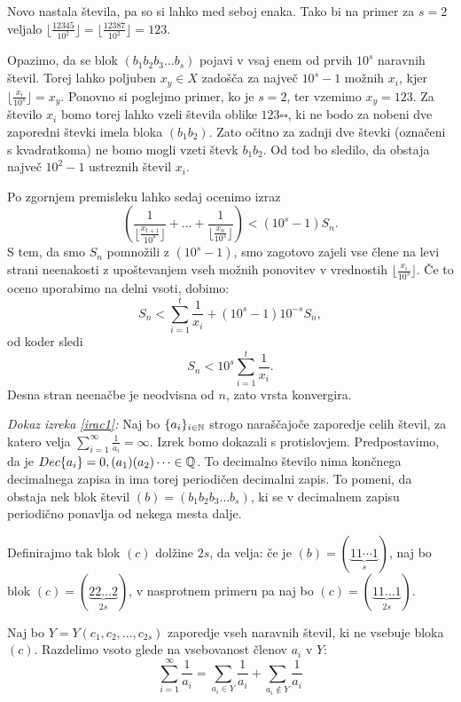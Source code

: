 \documentclass[twoside,11pt]{article}
\begin{document}
Novo nastala števila, pa so si lahko med seboj enaka. Tako bi na primer za $s=2$ veljalo 
$ \lfloor\frac{12345}{10^2}\rfloor = \lfloor \frac{12387}{10^2}\rfloor = 123$.

Opazimo, da se blok $(b_1b_2b_3 \dots b_s)$ pojavi v vsaj enem od prvih $10^s$ naravnih števil.
Torej lahko poljuben $x_y \in X$ zadošča za največ $10^s - 1$ možnih $x_i$, kjer $\lfloor \frac{x_i}{10^s} \rfloor = x_y$.
%
Ponovno si poglejmo primer, ko je $s=2$, ter vzemimo $x_y = 123$. Za število $x_i$ bomo torej lahko vzeli števila oblike $123 \square \square$,
ki ne bodo za nobeni dve zaporedni števki imela bloka $(b_1b_2)$. 
Zato očitno za zadnji dve števki (označeni s kvadratkoma) ne bomo mogli vzeti števk $b_1b_2$. 
Od tod bo sledilo, da obstaja največ $10^2 - 1$ ustreznih števil $x_i$.

Po zgornjem premisleku lahko sedaj ocenimo izraz 
\[(\frac{1}{ \lfloor\frac{x_{t + 1}}{10^s}\rfloor} + \dots + \frac{1}{\lfloor\frac{x_n}{10^s}\rfloor}) < (10^s - 1)S_n.\]
S tem, da smo $S_n$ pomnožili z $(10^s - 1)$, smo zagotovo zajeli vse člene na levi strani neenakosti
z upoštevanjem vseh možnih ponovitev v vrednostih $\lfloor\frac{x_i}{10^s}\rfloor$.
Če to oceno uporabimo na delni vsoti, dobimo:
\[
    S_n < \sum_{i=1}^t \frac{1}{x_i} + (10^s - 1)10^{-s}S_n,
\] 
od koder sledi
\[
    S_n < 10^s \sum_{i=1}^t \frac{1}{x_i}.
\]
Desna stran neenačbe je neodvisna od $n$, zato vrsta konvergira.

\QED

\noindent
{\em Dokaz izreka \ref{irac1}:\/} Naj bo $\{a_i\}_{i\in \mathbb{N}}$ strogo naraščajoče zaporedje
celih števil, za katero velja $\sum_{i=1}^{\infty}\frac{1}{a_i} = \infty$. Izrek bomo dokazali
s protislovjem. Predpostavimo, da je $Dec\{a_i\} = 0,(a_1)(a_2) \dots \in \mathbb{Q}$. 
To decimalno
število nima končnega decimalnega zapisa in ima torej periodičen decimalni zapis.
To pomeni, da obstaja nek blok števil $(b) = (b_1b_2b_3 \dots b_s)$,
ki se v decimalnem zapisu periodično ponavlja od nekega mesta dalje. 

Definirajmo tak blok $(c)$ dolžine $2s$, da velja: 
če je $(b) = (\underbrace{11 \cdots 1}_{s})$, naj bo blok $(c) = (\underbrace{22\dots 2}_{2s})$, 
v nasprotnem primeru pa naj bo $(c) = (\underbrace{11\dots 1}_{2s})$.

Naj bo $Y = Y(c_1, c_2, \dots, c_{2s})$ zaporedje vseh naravnih števil, 
ki ne vsebuje bloka $(c)$.
Razdelimo vsoto glede na vsebovanost členov $a_i$ v $Y$:
\[
    \sum_{i=1}^{\infty} \frac{1}{a_i} = \sum_{a_i \in Y}\frac{1}{a_i} + \sum_{a_i \notin Y} \frac{1}{a_i}
    \]
\end{document}
